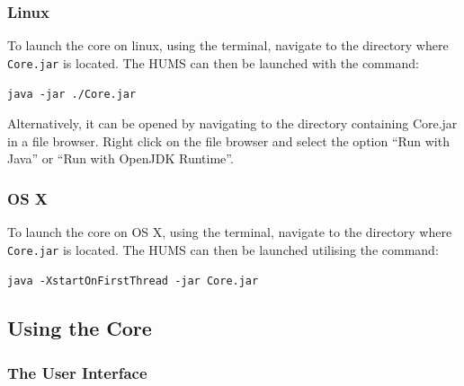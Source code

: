 \documentclass[10pt,a4paper]{article}
\begin{document}
\subsubsection{Linux}
To launch the core on linux, using the terminal, navigate to the directory where \texttt{Core.jar} is located. The HUMS can then be launched with the command:
\begin{center}
\texttt{java -jar ./Core.jar}
\end{center}
Alternatively, it can be opened by navigating to the directory containing Core.jar in a file browser. Right click on the file browser and select the option ``Run with Java'' or ``Run with OpenJDK Runtime''.

\subsubsection{OS X}
To launch the core on OS X, using the terminal, navigate to the directory where \texttt{Core.jar} is located. The HUMS can then be launched utilising the command:
\begin{center}
\texttt{java -XstartOnFirstThread -jar Core.jar}
\end{center}

\subsection{Using the Core}
\label{sec:core}

\subsubsection{The User Interface}
\end{document}
